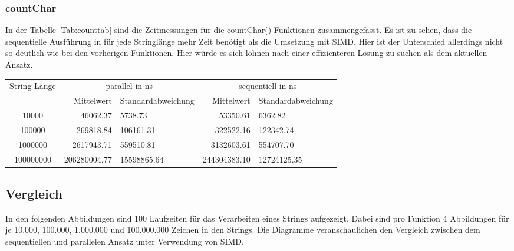\documentclass[plainarticle,zihtitle,german,final,hyperref,utf8]{zihpub}
\begin{document}
\subsubsection{countChar}
In der Tabelle \ref{Tab:counttab} sind die Zeitmessungen für die countChar() Funktionen zusammengefasst.
Es ist zu sehen, dass die sequentielle Ausführung in für jede Stringlänge mehr Zeit benötigt als die Umsetzung mit SIMD. Hier ist der Unterschied allerdings nicht so deutlich wie bei den vorherigen Funktionen. Hier würde es sich lohnen nach einer effizienteren Lösung zu suchen als dem aktuellen Ansatz.
\newline
\begin{tabular}{|c|r|l|r|l|}
	\hline
	\multicolumn{1}{|c|}{String Länge} & \multicolumn{2}{c|}{parallel in ns} & \multicolumn{2}{c|}{sequentiell in ns} \\
	\cline{2-5}
	& Mittelwert & Standardabweichung  & Mittelwert & Standardabweichung \\
	\hline
	10000 & 46062.37 & 5738.73 & 53350.61 & 6362.82 \\
	100000 & 269818.84 & 106161.31 & 322522.16 & 122342.74 \\
	1000000 & 2617943.71 & 559510.81 & 3132603.61 & 554707.70 \\
	100000000 & 206280004.77 & 15598865.64 & 244304383.10 & 12724125.35 \\
	\hline
\end{tabular}
\label{Tab:counttab}

\newpage
\subsection{Vergleich}
In den folgenden Abbildungen sind 100 Laufzeiten für das Verarbeiten eines Strings aufgezeigt. Dabei sind pro Funktion 4 Abbildungen für je 10.000, 100.000, 1.000.000 und 100.000.000 Zeichen in den Strings. Die Diagramme veranschaulichen den Vergleich zwischen dem sequentiellen und parallelen Ansatz unter Verwendung von SIMD.
\end{document}
